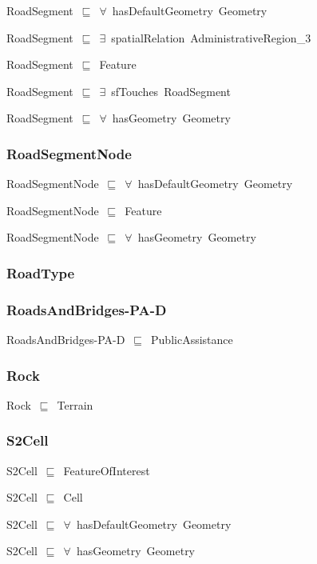 \documentclass{article}
\begin{document}
RoadSegment~\ensuremath{\sqsubseteq}~\ensuremath{\forall}~hasDefaultGeometry~Geometry~

RoadSegment~\ensuremath{\sqsubseteq}~\ensuremath{\exists}~spatialRelation~AdministrativeRegion\_3~

RoadSegment~\ensuremath{\sqsubseteq}~Feature~

RoadSegment~\ensuremath{\sqsubseteq}~\ensuremath{\exists}~sfTouches~RoadSegment~

RoadSegment~\ensuremath{\sqsubseteq}~\ensuremath{\forall}~hasGeometry~Geometry~

\subsubsection*{RoadSegmentNode}

RoadSegmentNode~\ensuremath{\sqsubseteq}~\ensuremath{\forall}~hasDefaultGeometry~Geometry~

RoadSegmentNode~\ensuremath{\sqsubseteq}~Feature~

RoadSegmentNode~\ensuremath{\sqsubseteq}~\ensuremath{\forall}~hasGeometry~Geometry~

\subsubsection*{RoadType}

\subsubsection*{RoadsAndBridges-PA-D}

RoadsAndBridges-PA-D~\ensuremath{\sqsubseteq}~PublicAssistance~

\subsubsection*{Rock}

Rock~\ensuremath{\sqsubseteq}~Terrain~

\subsubsection*{S2Cell}

S2Cell~\ensuremath{\sqsubseteq}~FeatureOfInterest~

S2Cell~\ensuremath{\sqsubseteq}~Cell~

S2Cell~\ensuremath{\sqsubseteq}~\ensuremath{\forall}~hasDefaultGeometry~Geometry~

S2Cell~\ensuremath{\sqsubseteq}~\ensuremath{\forall}~hasGeometry~Geometry~
\end{document}

